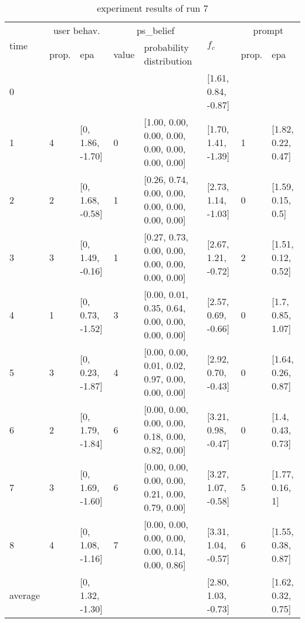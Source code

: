 \begin{table}[htbp]\footnotesize
\caption{experiment results of run 7}
\begin{center}
\begin{tabular}{|p{0.4cm}|p{0.6cm}|l|p{0.6cm}|p{3.3cm}|l|p{0.6cm}|l|}
\hline

\multirow{2}{*}{time} & \multicolumn{2}{c|}{user behav.} & \multicolumn{2}{c|}{ps\_belief} &
\multirow{2}{*}{$f_c$} & \multicolumn{2}{c|}{prompt} \\ \cline{2-5}\cline{ 7- 8}
& prop. & epa & value & probability distribution &  & prop. & epa \\ \hline

0 & \multicolumn{1}{l|}{} &  & \multicolumn{1}{l|}{} &  & [1.61, 0.84, -0.87] & \multicolumn{1}{l|}{} &  \\ \hline
1 & 4 & [0, 1.86, -1.70] & 0 & [1.00, 0.00, 0.00, 0.00, 0.00, 0.00, 0.00, 0.00] & [1.70, 1.41, -1.39] & 1 & [1.82, 0.22, 0.47] \\ \hline
2 & 2 & [0, 1.68, -0.58] & 1 & [0.26, 0.74, 0.00, 0.00, 0.00, 0.00, 0.00, 0.00] & [2.73, 1.14, -1.03] & 0 & [1.59, 0.15, 0.5] \\ \hline
3 & 3 & [0, 1.49, -0.16] & 1 & [0.27, 0.73, 0.00, 0.00, 0.00, 0.00, 0.00, 0.00] & [2.67, 1.21, -0.72] & 2 & [1.51, 0.12, 0.52] \\ \hline
4 & 1 & [0, 0.73, -1.52] & 3 & [0.00, 0.01, 0.35, 0.64, 0.00, 0.00, 0.00, 0.00] & [2.57, 0.69, -0.66] & 0 & [1.7, 0.85, 1.07] \\ \hline
5 & 3 & [0, 0.23, -1.87] & 4 & [0.00, 0.00, 0.01, 0.02, 0.97, 0.00, 0.00, 0.00] & [2.92, 0.70, -0.43] & 0 & [1.64, 0.26, 0.87] \\ \hline
6 & 2 & [0, 1.79, -1.84] & 6 & [0.00, 0.00, 0.00, 0.00, 0.18, 0.00, 0.82, 0.00] & [3.21, 0.98, -0.47] & 0 & [1.4, 0.43, 0.73] \\ \hline
7 & 3 & [0, 1.69, -1.60] & 6 & [0.00, 0.00, 0.00, 0.00, 0.21, 0.00, 0.79, 0.00] & [3.27, 1.07, -0.58] & 5 & [1.77, 0.16, 1] \\ \hline
8 & 4 & [0, 1.08, -1.16] & 7 & [0.00, 0.00, 0.00, 0.00, 0.00, 0.14, 0.00, 0.86] & [3.31, 1.04, -0.57] & 6 & [1.55, 0.38, 0.87] \\ \hline
\multicolumn{1}{|l|}{average} & \multicolumn{1}{l|}{} & [0, 1.32, -1.30] & \multicolumn{1}{l|}{} &  & [2.80, 1.03, -0.73] & \multicolumn{1}{l|}{} & [1.62, 0.32, 0.75] \\ \hline
\end{tabular}
\end{center}
\label{}
\end{table}



